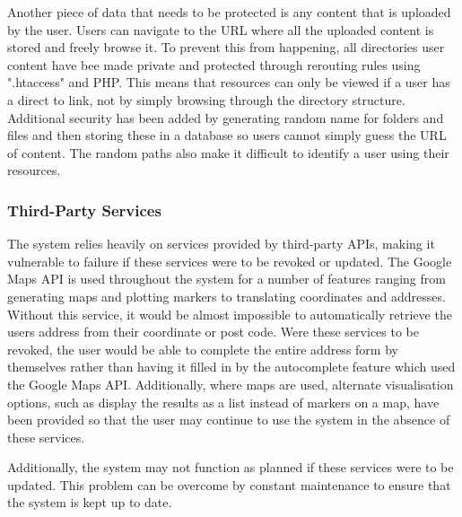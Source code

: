 Another piece of data that needs to be protected is any content that is uploaded by the user. Users can navigate to the URL where all the uploaded content is stored and freely browse it. To prevent this from happening, all directories user content have bee made private and protected through rerouting rules using ".htaccess" and PHP. This means that resources can only be viewed if a user has a direct to link, not by simply browsing through the directory structure. Additional security has been added by generating random name for folders and files and then storing these in a database so users cannot simply guess the URL of content. The random paths also make it difficult to identify a user using their resources. 

\subsubsection{Third-Party Services}
The system relies heavily on services provided by third-party APIs, making it vulnerable to failure if these services were to be revoked or updated. The Google Maps API is used throughout the system for a number of features ranging from generating maps and plotting markers to translating coordinates and addresses. Without this service, it would be almost impossible to automatically retrieve the users address from their coordinate or post code. Were these services to be revoked, the user would be able to complete the entire address form by themselves rather than having it filled in by the autocomplete feature which used the Google Maps API. Additionally, where maps are used, alternate visualisation options, such as display the results as a list instead of markers on a map, have been provided so that the user may continue to use the system in the absence of these services. 

Additionally, the system may not function as planned if these services were to be updated. This problem can be overcome by constant maintenance to ensure that the system is kept up to date.

\newpage